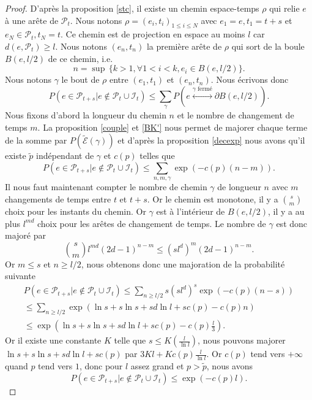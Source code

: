 \documentclass[titlepage,a4paper,12pt]{article}
\newcounter{prop}
\begin{document}
\begin{proof}
D'après la proposition \ref{stc}, il existe un chemin espace-temps $\rho$ qui relie $e$ à une arête de $\mathcal{P}_t$. Nous notons $\rho= (e_i,t_i)_{1\leqslant i \leqslant N}$ avec $e_1 = e, t_1 = t+s$ et $e_N\in \mathcal{P}_t, t_N = t$. Ce chemin est de projection en espace au moins $l$ car $d(e,\mathcal{P}_t)\geqslant l$. Nous notons $(e_n,t_n)$ la première arête de $\rho$ qui sort de la boule $B(e,l/2)$ de ce chemin, i.e. 
$$ n = \sup\,\big\{k>1, \forall 1<i<k, e_i\in B(e,l/2) \big\}.
$$
Nous notons $\gamma$ le bout de $\rho$ entre $(e_1,t_1)$ et $(e_n,t_n)$.
Nous écrivons donc 
$$ P(e\in \mathcal{P}_{t+s}|e\notin \mathcal{P}_t\cup \mathcal{I}_t) \leqslant \sum_{\gamma}P( e\overset{\gamma \text{ fermé}}{\longleftrightarrow} \partial B(e,l/2)).
$$
Nous fixons d'abord la longueur du chemin $n$ et le nombre de changement de temps $m$. La proposition \ref{couple} et \ref{BK'} nous permet de majorer chaque terme de la somme par $P(\tilde{\mathcal{E}}(\gamma))$ et d'après la proposition \ref{decexp} nous avons qu'il existe $\tilde{p}$ indépendant de $\gamma$ et $c(p)$ telles que 
$$P(e\in \mathcal{P}_{t+s}|e\notin \mathcal{P}_t\cup \mathcal{I}_t) \leqslant \sum_{n,m,\gamma} \exp(-c(p)(n-m)).
$$
Il nous faut maintenant compter le nombre de chemin $\gamma$ de longueur $n$ avec $m$ changements de temps entre $t$ et $t+s$. Or le chemin est monotone, il y a $\displaystyle s \choose m$ choix pour les instants du chemin. Or $\gamma$ est à l'intérieur de $B(e,l/2)$, il y a au plus $l^{md}$ choix pour les arêtes de changement de temps. Le nombre de $\gamma$ est donc majoré par
$$ {s\choose m} l^{md} (2d-1)^{n-m}\leqslant (sl^d)^m(2d-1)^{n-m}.
$$
Or $m\leqslant s$ et $n\geqslant l/2$, nous obtenons donc une majoration de la probabilité suivante
\begin{multline*}P(e\in \mathcal{P}_{t+s}|e\notin \mathcal{P}_t\cup \mathcal{I}_t) \leqslant \sum_{n\geqslant l/2}s(sl^d)^s\exp(-c(p)(n-s))\\\leqslant \sum_{n\geqslant l/2} \exp(\ln s+s\ln s+sd\ln l +sc(p)-c(p)n)
\\ \leqslant \exp(\ln s+s\ln s+sd\ln l +sc(p) -c(p)\frac{l}{3}).
\end{multline*}
Or il existe une constante $K$ telle que $\displaystyle s \leqslant K(\frac{l}{\ln l})$, nous pouvons majorer $\ln s+s\ln s+sd\ln l +sc(p)$ par $\displaystyle 3Kl+Kc(p)\frac{l}{\ln l}$. Or $c(p)$ tend vers $+\infty$ quand $p$ tend vers $1$, donc pour $l$ assez grand et $p>\tilde{p}$, nous avons 
$$P(e\in \mathcal{P}_{t+s}|e\notin \mathcal{P}_t\cup \mathcal{I}_t) \leqslant \exp(-c(p)l).
$$
\end{proof}
\end{document}
